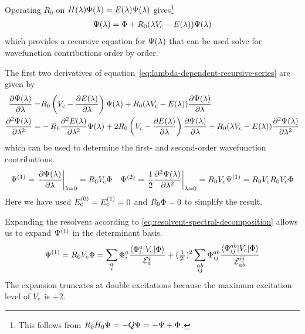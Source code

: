 \documentclass[11pt]{article}
\numberwithin{equation}{section}
\begin{document}
\begin{samepage}
\begin{rmk}
Operating $R_0$ on $H(\lambda )\Psi (\lambda )=E(\lambda )\Psi (\lambda )$ gives\footnote{This follows from $R_0H_0\Psi =-Q\Psi =-\Psi +\Phi $.}
\begin{align}
\label{eq:lambda-dependent-recursive-series}
  \Psi (\lambda )
=
  \Phi 
+
  R_0
  (
    \lambda  V_{\mathrm{c}}
  -
    E(\lambda )
  )
  \Psi (\lambda )
\end{align}
which provides a recursive equation for $\Psi (\lambda )$ that can be used solve for wavefunction contributions order by order.
\end{rmk}
\end{samepage}

\begin{ex}
The first two derivatives of equation~\ref{eq:lambda-dependent-recursive-series} are given by
\begin{align*}
  \frac {\partial\Psi (\lambda )}{\partial\lambda }
=&
  R_0
  \left(
    V_{\mathrm{c}}
  -
    \frac {\partial E(\lambda )}{\partial\lambda }
  \right)
  \Psi (\lambda )
+
  R_0
  (
    \lambda  V_{\mathrm{c}}
  -
    E(\lambda )
  )
  \frac {\partial\Psi (\lambda )}{\partial\lambda }
\\
  \frac {\partial^2\Psi (\lambda )}{\partial\lambda ^2}
=&
-
  R_0
  \frac {\partial^2E(\lambda )}{\partial\lambda ^2}
  \Psi (\lambda )
+
  2
  R_0
  \left(
    V_{\mathrm{c}}
  -
    \frac {\partial E(\lambda )}{\partial\lambda }
  \right)
  \frac {\partial\Psi (\lambda )}{\partial\lambda }
+
  R_0
  (
    \lambda  V_{\mathrm{c}}
  -
    E(\lambda )
  )
  \frac {\partial^2\Psi (\lambda )}{\partial\lambda ^2}
\end{align*}
which can be used to determine the first- and second-order wavefunction contributions.
\begin{align*}
  \Psi ^{(1)}
=
  \left.
  \frac {\partial\Psi (\lambda )}{\partial\lambda }
  \right|_{\lambda =0}
=
  R_0
  V_{\mathrm{c}}
  \Phi 
&&
  \Psi ^{(2)}
=
  \left.
  \frac {1}{2}
  \frac {\partial^2\Psi (\lambda )}{\partial\lambda ^2}
  \right|_{\lambda =0}
=
  R_0
  V_{\mathrm{c}}
  \Psi ^{(1)}
=
  R_0
  V_{\mathrm{c}}
  R_0
  V_{\mathrm{c}}
  \Phi 
\end{align*}
Here we have used $E_{\mathrm{c}}^{(0)}=E_{\mathrm{c}}^{(1)}=0$ and $R_0\Phi =0$ to simplify the result.
\end{ex}

\begin{ex}
\label{ex:first-order-wavefunction-expansion-unsimplified}
Expanding the resolvent according to \cref{eq:resolvent-spectral-decomposition} allows us to expand $\Psi ^{(1)}$ in the determinant basis.
\begin{align}
\label{eq:first-order-wavefunction-expansion-unsimplified}
  \Psi ^{(1)}
=
  R_0
  V_{\mathrm{c}}
  \Phi 
=
  \sum_{\substack{a\\i}}
  \Phi _i^a
  \frac {\langle\Phi _i^a|V_{\mathrm{c}}|\Phi \rangle}{\mathcal{E}_a^i}
+
  (\tfrac{1}{2!})^2
  \sum_{\substack{ab\\ij}}
  \Phi _{ij}^{ab}
  \frac {\langle\Phi _{ij}^{ab}|V_{\mathrm{c}}|\Phi \rangle}{\mathcal{E}_{ab}^{ij}}
\end{align}
The expansion truncates at double excitations because the maximum excitation level of $V_{\mathrm{c}}$ is $+2$.
\end{ex}
\end{document}
